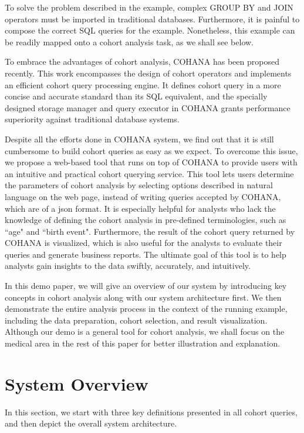 To solve the problem described in the example, complex GROUP BY and JOIN operators must be imported in traditional databases.
Furthermore, it is painful to compose the correct SQL queries for the example.
Nonetheless, this example can be readily mapped onto a cohort analysis task, as we shall see below.

To embrace the advantages of cohort analysis, COHANA\cite{jiang2016cohort} has been proposed recently. 
This work encompasses the design of cohort operators and implements an efficient cohort query processing engine. It defines cohort query in a more concise and accurate standard than its SQL equivalent, and the specially designed storage manager and query executor in COHANA grants performance superiority against traditional database systems. 

Despite all the efforts done in COHANA system, we find out that it is still cumbersome to build cohort queries as easy as we expect.
To overcome this issue, we propose a web-based tool that runs on top of COHANA to provide users with an intuitive and practical cohort querying service. 
This tool lets users determine the parameters of cohort analysis by selecting options described in natural language on the web page, instead of writing queries accepted by COHANA, which are of a json format.  
It is especially helpful for analysts who lack the knowledge of defining the cohort analysis in pre-defined terminologies, such as ``age" and ``birth event". 
Furthermore, the result of the cohort query returned by COHANA is visualized,
which is also useful for the analysts to evaluate their queries and generate business reports.
The ultimate goal of this tool is to help analysts gain insights to the data swiftly, accurately, and intuitively.

In this demo paper, we will give an overview of our system by introducing key concepts in cohort analysis along with our system architecture first. We then demonstrate the entire analysis process in the context of the running example, including the data preparation, cohort selection, and result visualization.
Although our demo is a general tool for cohort analysis, we shall focus on the medical area in the rest of this paper for better illustration and explanation.

\section{System Overview}
In this section, we start with three key definitions presented in all cohort queries, and then depict the overall system architecture.  

